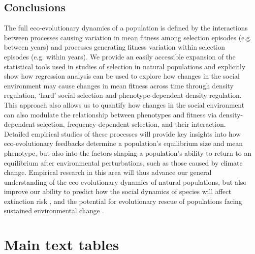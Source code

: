 \documentclass{article}
\begin{document}
\subsection{Conclusions}
 The full eco-evolutionary dynamics of a population is defined by the interactions between processes causing variation in mean fitness among selection episodes (e.g. between years) and processes generating fitness variation within selection episodes (e.g. within years). We provide an easily accessible expansion of the statistical tools used in studies of selection in natural populations and explicitly show how regression analysis can be used to explore how changes in the social environment may cause changes in mean fitness across time through density regulation, `hard' social selection and phenotype-dependent density regulation. This approach also allows us to quantify how changes in the social environment can also modulate the relationship between phenotypes and fitness via density-dependent selection, frequency-dependent selection, and their interaction. Detailed empirical studies of these processes will provide key insights into how eco-evolutionary feedbacks determine a population's equilibrium size and mean phenotype, but also into the factors shaping a population's ability to return to an equilibrium after environmental perturbations, such as those caused by climate change. Empirical research in this area will thus advance our general understanding of the eco-evolutionary dynamics of natural populations, but also improve our ability to predict how the social dynamics of species will affect extinction risk \citep{Angulo2018}, and the potential for evolutionary rescue of populations facing sustained environmental change \citep{Chevin2010}.

 


\newpage
\section{Main text tables}
\end{document}
